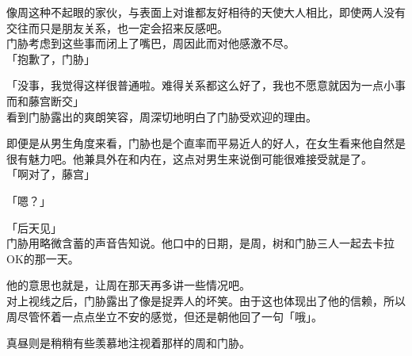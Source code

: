 像周这种不起眼的家伙，与表面上对谁都友好相待的天使大人相比，即使两人没有交往而只是朋友关系，也一定会招来反感吧。\\

门胁考虑到这些事而闭上了嘴巴，周因此而对他感激不尽。\\

「抱歉了，门胁」

「没事，我觉得这样很普通啦。难得关系都这么好了，我也不愿意就因为一点小事而和藤宫断交」\\

看到门胁露出的爽朗笑容，周深切地明白了门胁受欢迎的理由。

即便是从男生角度来看，门胁也是个直率而平易近人的好人，在女生看来他自然是很有魅力吧。他兼具外在和内在，这点对男生来说倒可能很难接受就是了。\\

「啊对了，藤宫」

「嗯？」

「后天见」\\

门胁用略微含蓄的声音告知说。他口中的日期，是周，树和门胁三人一起去卡拉OK的那一天。

他的意思也就是，让周在那天再多讲一些情况吧。\\

对上视线之后，门胁露出了像是捉弄人的坏笑。由于这也体现出了他的信赖，所以周尽管怀着一点点坐立不安的感觉，但还是朝他回了一句「哦」。

真昼则是稍稍有些羡慕地注视着那样的周和门胁。

